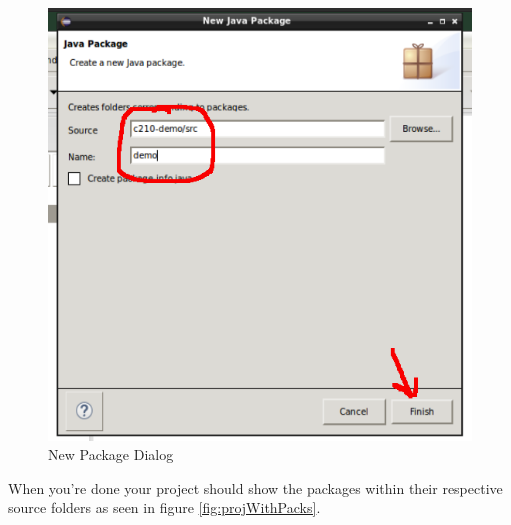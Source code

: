 \documentclass[]{tufte-handout}
\begin{document}
\vspace{.1in}
\begin{center}
\begin{figure}[h]
\includegraphics[scale=.5]{Eclipse-NewPackage.png}
\caption{New Package Dialog}
\label{fig:newpackage} 
\end{figure}
\end{center}
\vspace{.1in}


When you're done your project should show the packages within their respective source folders as seen in figure \ref{fig:projWithPacks}.
\end{document}
